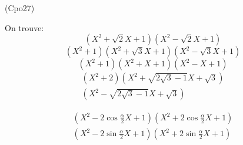 \begin{tiny}(Cpo27)\end{tiny} On trouve:
\begin{displaymath}
 (X^2+\sqrt{2}X+1)(X^2-\sqrt{2}X+1)
\end{displaymath}
\begin{displaymath}
 (X^2+1)(X^2+\sqrt{3}X+1)(X^2-\sqrt{3}X+1)
\end{displaymath}
\begin{displaymath}
 (X^2+1)(X^2+X+1)(X^2-X+1)
\end{displaymath}
\begin{multline*}
(X^2+2)
(X^2+ \sqrt{2\sqrt{3}-1} X+\sqrt{3})\\
(X^2- \sqrt{2\sqrt{3}-1} X+\sqrt{3})
\end{multline*}

\begin{multline*}
 (X^2-2\cos\frac{\alpha}{2} X +1)(X^2+2\cos\frac{\alpha}{2} X +1) \\
(X^2-2\sin\frac{\alpha}{2} X +1)(X^2+2\sin\frac{\alpha}{2} X +1)
\end{multline*}
